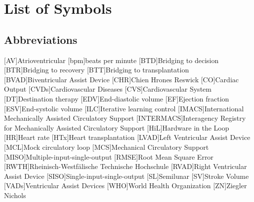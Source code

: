 \chapter*{List of Symbols}										%



\section*{Abbreviations}
%
[AV]{Atrioventricular}
[bpm]{beats per minute}
[BTD]{Bridging to decision}
[BTR]{Bridging to recovery}
[BTT]{Bridging to transplantation}
[BVAD]{Biventricular Assist Device}
[CHR]{Chien Hrones Reswick}
[CO]{Cardiac Output}
[CVDs]{Cardiovascular Diseases}
[CVS]{Cardiovascular System}
[DT]{Destination therapy}
[EDV]{End-diastolic volume}
[EF]{Ejection fraction}
[ESV]{End-systolic volume}
[ILC]{Iterative learning control}
[IMACS]{International Mechanically Assisted Circulatory Support}
[INTERMACS]{Interagency Registry for Mechanically Assisted Circulatory Support}
[HiL]{Hardware in the Loop}
[HR]{Heart rate}
[HTx]{Heart transplantation}
[LVAD]{Left Ventricular Assist Device}
[MCL]{Mock circulatory loop}
[MCS]{Mechanical Circulatory Support}
[MISO]{Multiple-input-single-output}
[RMSE]{Root Mean Square Error}
[RWTH]{Rheinisch-Westf{\"a}lische Technische Hochschule}
[RVAD]{Right Ventricular Assist Device}
[SISO]{Single-input-single-output}
[SL]{Semilunar}
[SV]{Stroke Volume}
[VADs]{Ventricular Assist Devices}
[WHO]{World Health Organization}
[ZN]{Ziegler Nichols}


